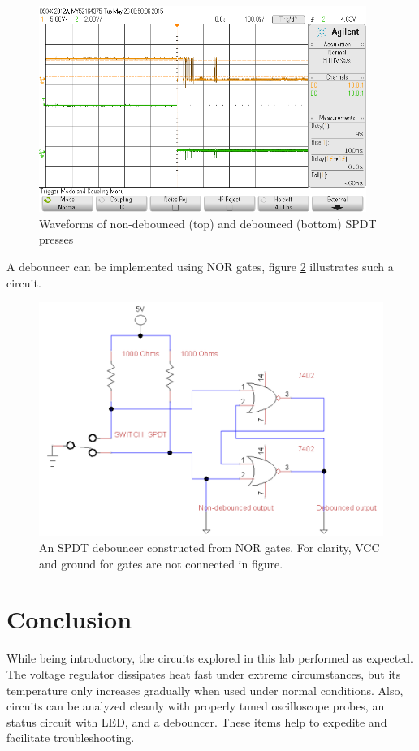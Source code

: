 \documentclass[11pt]{article}
\begin{document}
\begin{figure}[h]
	\centering
	\includegraphics[width=0.95\textwidth, draft=false]{debounce}
	\caption{Waveforms of non-debounced (top) and debounced (bottom) SPDT presses}
	\label{fig:debounce}
\end{figure}

A debouncer can be implemented using NOR gates, figure \ref{fig:nor_gates} illustrates such a circuit. 

\begin{figure}[h]
	\centering
	\includegraphics[scale=0.5, draft=false]{nor_gates}
	\caption{An SPDT debouncer constructed from NOR gates. For clarity, VCC and ground for gates are not connected in figure.}
	\label{fig:nor_gates}
\end{figure}

\section{Conclusion}

While being introductory, the circuits explored in this lab performed as expected. The voltage regulator dissipates heat fast under extreme circumstances, but its temperature only increases gradually when used under normal conditions. Also, circuits can be analyzed cleanly with properly tuned oscilloscope probes, an status circuit with LED, and a debouncer. These items help to expedite and facilitate troubleshooting.
\end{document}
